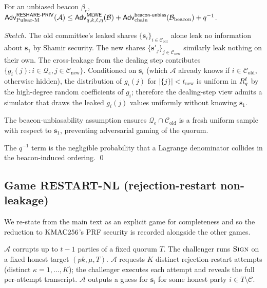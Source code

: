 \begin{theorem}
\label{thm:reshare-priv}
For an unbiased beacon $\beta_e$,
$\mathsf{Adv}^{\mathsf{RESHARE\textsf{-}PRIV}}_{\mathrm{Pulsar\text{-}M}}(\mathcal{A}) \le \mathsf{Adv}^{\mathsf{MLWE}}_{q, k, \ell, \eta}(\mathcal{B}) + \mathsf{Adv}^{\mathsf{beacon\textsf{-}unbias}}_{\mathrm{chain}}(\mathcal{B}_{\mathrm{beacon}}) + q^{-1}$.
\end{theorem}

\begin{proof}[Sketch]
The old committee's leaked shares $\{\mathbf{s}_i\}_{i \in
\mathcal{C}_{\mathrm{old}}}$ alone leak no information about
$\mathbf{s}_1$ by Shamir security. The new shares
$\{\mathbf{s}'_j\}_{j \in \mathcal{C}_{\mathrm{new}}}$ similarly leak
nothing on their own. The cross-leakage from the dealing step
contributes $\{g_i(j) : i \in \mathcal{Q}_e, j \in
\mathcal{C}_{\mathrm{new}}\}$. Conditioned on $\mathbf{s}_i$ (which
$\mathcal{A}$ already knows if $i \in \mathcal{C}_{\mathrm{old}}$,
otherwise hidden), the distribution of $g_i(j)$ for $|\{j\}| < t_{\mathrm{new}}$ is uniform in $R_q^\ell$ by the high-degree
random coefficients of $g_i$; therefore the dealing-step view admits
a simulator that draws the leaked $g_i(j)$ values uniformly without
knowing $\mathbf{s}_1$.

The beacon-unbiasability assumption ensures
$\mathcal{Q}_e \cap \mathcal{C}_{\mathrm{old}}$ is a fresh uniform
sample with respect to $\mathbf{s}_1$, preventing adversarial gaming
of the quorum.

The $q^{-1}$ term is the negligible probability that a Lagrange
denominator collides in the beacon-induced ordering. \qed
\end{proof}

\subsection{Game RESTART-NL (rejection-restart non-leakage)}
\label{sec:game-restart-nl}

We re-state  from the main text as an
explicit game for completeness and so the reduction to $\mathrm{KMAC256}$'s
PRF security is recorded alongside the other games.

\begin{game}[RESTART-NL]
\label{game:restart-nl}
$\mathcal{A}$ corrupts up to $t-1$ parties of a fixed quorum $T$.
The challenger runs $\textsc{Sign}$ on a fixed honest target $(\mathit{pk}, \mu, T)$.
$\mathcal{A}$ requests $K$ distinct rejection-restart attempts
(distinct $\kappa = 1, \dots, K$); the challenger executes each
attempt and reveals the full per-attempt transcript. $\mathcal{A}$
outputs a guess for $\mathbf{s}_i$ for some honest party $i \in T
\setminus \mathcal{C}$.
\end{game}

